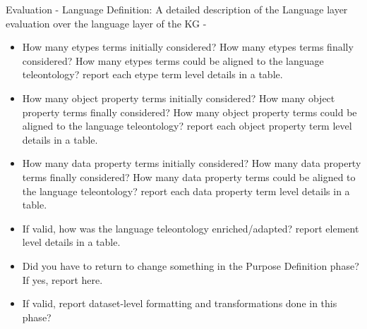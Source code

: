 Evaluation - Language Definition: A detailed description of the Language layer evaluation over the language layer of the KG -
\begin{itemize}
    \item How many etypes terms initially considered? How many etypes terms finally considered? How many etypes terms could be aligned to the  language teleontology? report each etype term level details in a table.
    \item How many object property terms initially considered? How many object property terms finally considered?  How many object property terms could be aligned to the  language teleontology? report each object property term level details in a table.
    \item How many data property terms initially considered? How many data property terms finally considered?  How many data property terms could be aligned to the language teleontology? report each data property term level details in a table.
    \item If valid, how was the language teleontology enriched/adapted? report element level details in a table.
    \item Did you have to return to change something in the Purpose Definition phase? If yes, report here.
    \item If valid, report dataset-level formatting and transformations done in this phase?
\end{itemize}
